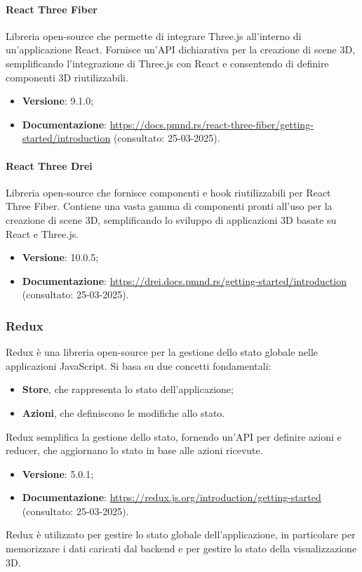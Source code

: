 \paragraph{React Three Fiber}
Libreria open-source che permette di integrare Three.js all'interno di
un'applicazione React. Fornisce un'API dichiarativa per la creazione di scene
3D, semplificando l'integrazione di Three.js con React e consentendo di
definire componenti 3D riutilizzabili.
\begin{itemize}
    \item \textbf{Versione}: 9.1.0;
    \item \textbf{Documentazione}: \url{https://docs.pmnd.rs/react-three-fiber/getting-started/introduction} (consultato:
          25-03-2025).
\end{itemize}

\paragraph{React Three Drei}
Libreria open-source che fornisce componenti e hook riutilizzabili per React
Three Fiber. Contiene una vasta gamma di componenti pronti all'uso per la
creazione di scene 3D, semplificando lo sviluppo di applicazioni 3D basate su
React e Three.js.
\begin{itemize}
    \item \textbf{Versione}: 10.0.5;
    \item \textbf{Documentazione}: \url{https://drei.docs.pmnd.rs/getting-started/introduction} (consultato:
          25-03-2025).
\end{itemize}

\subsubsection{Redux}
Redux è una libreria open-source per la gestione dello stato globale nelle
applicazioni JavaScript. Si basa su due concetti fondamentali:
\begin{itemize}
    \item \textbf{Store}, che rappresenta lo stato dell'applicazione;
    \item \textbf{Azioni}, che definiscono le modifiche allo stato.
\end{itemize}
Redux semplifica la gestione dello stato, fornendo un'API per definire
azioni e reducer, che aggiornano lo stato in base alle azioni ricevute.
\begin{itemize}
    \item \textbf{Versione}: 5.0.1;
    \item \textbf{Documentazione}: \url{https://redux.js.org/introduction/getting-started} (consultato:
          25-03-2025).
\end{itemize}
Redux è utilizzato per gestire lo stato globale dell'applicazione, in particolare per
memorizzare i dati caricati dal backend e per gestire lo stato della
visualizzazione 3D.

